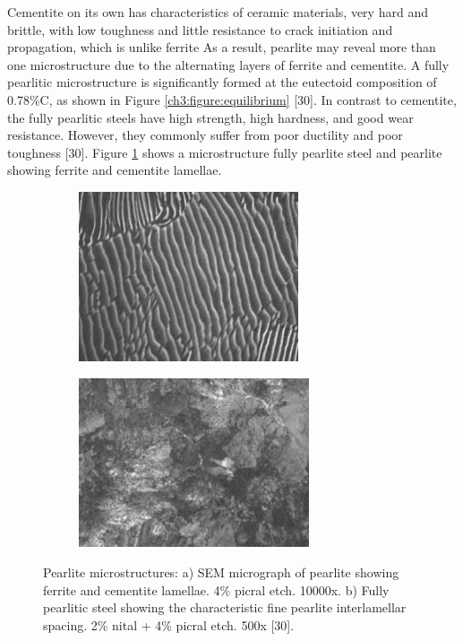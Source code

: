 \documentclass[12pt]{report}
\begin{document}
Cementite on its own has characteristics of ceramic materials, very hard and brittle, with low toughness and little resistance to crack initiation and propagation, which is unlike ferrite \cite{bajaj2020steels} As a result, pearlite may reveal more than one microstructure due to the alternating layers of ferrite and cementite. A fully pearlitic microstructure is significantly formed at the eutectoid composition of 0.78\%C, as shown in Figure \ref{ch3:figure:equilibrium} [30]. In contrast to cementite, the fully pearlitic steels have high strength, high hardness, and good wear resistance. However, they commonly suffer from poor ductility and poor toughness [30]. Figure \ref{ch3:figure:pearlite:microstructures} shows a microstructure fully pearlite steel and pearlite showing ferrite and cementite lamellae.

\begin{figure}[H]

\centering
\begin{subfigure}{.45\textwidth}
    \centering
    \includegraphics[height=5cm,width=\textwidth]{ferrite_and_cementite_lamellae_micrograph.jpg}
    \caption{}
\end{subfigure}
\begin{subfigure}{.45\textwidth}
    \centering
    \includegraphics[height=5cm,width=\textwidth]{fully_pearlitic_steel.jpg}
    \caption{}
\end{subfigure}

\caption{Pearlite microstructures:  a) SEM micrograph of pearlite showing ferrite and cementite lamellae. 4\% picral etch. 10000x. b) Fully pearlitic steel showing the characteristic fine pearlite interlamellar spacing. 2\% nital + 4\% picral etch. 500x [30].}
\label{ch3:figure:pearlite:microstructures}
\end{figure}
\end{document}

